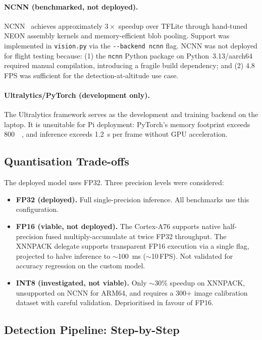 \documentclass[10pt,a4paper]{article}
\begin{document}
\paragraph{NCNN (benchmarked, not deployed).}
NCNN~\cite{ncnn} achieves approximately $3\times$ speedup over TFLite through hand-tuned NEON assembly kernels and memory-efficient blob pooling. Support was implemented in \texttt{vision.py} via the \texttt{-{}-backend ncnn} flag. NCNN was not deployed for flight testing because: (1) the \texttt{ncnn} Python package on Python~3.13/aarch64 required manual compilation, introducing a fragile build dependency; and (2) 4.8\,FPS was sufficient for the detection-at-altitude use case.

\paragraph{Ultralytics/PyTorch (development only).}
The Ultralytics framework serves as the development and training backend on the laptop. It is unsuitable for Pi deployment: PyTorch's memory footprint exceeds \SI{800}{\mega\byte}, and inference exceeds \SI{1.2}{\second} per frame without GPU acceleration.

\subsection{Quantisation Trade-offs}

The deployed model uses FP32. Three precision levels were considered:

\begin{itemize}
    \item \textbf{FP32 (deployed).} Full single-precision inference. All benchmarks use this configuration.
    \item \textbf{FP16 (viable, not deployed).} The Cortex-A76 supports native half-precision fused multiply-accumulate at twice FP32 throughput. The XNNPACK delegate supports transparent FP16 execution via a single flag, projected to halve inference to ${\sim}$\SI{100}{\milli\second} (${\sim}$10\,FPS). Not validated for accuracy regression on the custom model.
    \item \textbf{INT8 (investigated, not viable).} Only ${\sim}$30\% speedup on XNNPACK, unsupported on NCNN for ARM64, and requires a 300+ image calibration dataset with careful validation. Deprioritised in favour of FP16.
\end{itemize}

\subsection{Detection Pipeline: Step-by-Step}
\end{document}
